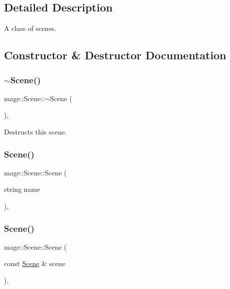 \subsection{Detailed Description}
A class of scenes. 

\subsection{Constructor \& Destructor Documentation}
\hypertarget{classmage_1_1_scene_adc40910fdca62586659c2961fe7e7f3c}{}\label{classmage_1_1_scene_adc40910fdca62586659c2961fe7e7f3c} 
\subsubsection{\texorpdfstring{$\sim$\+Scene()}{~Scene()}}
{\footnotesize\ttfamily mage\+::\+Scene\+::$\sim$\+Scene (\begin{DoxyParamCaption}{ }\end{DoxyParamCaption})\hspace{0.3cm}{\ttfamily [virtual]}, {\ttfamily [default]}}

Destructs this scene. \hypertarget{classmage_1_1_scene_aaed505892f2a639db47e5d5767f41337}{}\label{classmage_1_1_scene_aaed505892f2a639db47e5d5767f41337} 
\subsubsection{\texorpdfstring{Scene()}{Scene()}\hspace{0.1cm}{\footnotesize\ttfamily [1/3]}}
{\footnotesize\ttfamily mage\+::\+Scene\+::\+Scene (\begin{DoxyParamCaption}\item[{string}]{name }\end{DoxyParamCaption})\hspace{0.3cm}{\ttfamily [explicit]}, {\ttfamily [protected]}}

\hypertarget{classmage_1_1_scene_a88d83ccb2e10549d5370f850b2b4c228}{}\label{classmage_1_1_scene_a88d83ccb2e10549d5370f850b2b4c228} 
\subsubsection{\texorpdfstring{Scene()}{Scene()}\hspace{0.1cm}{\footnotesize\ttfamily [2/3]}}
{\footnotesize\ttfamily mage\+::\+Scene\+::\+Scene (\begin{DoxyParamCaption}\item[{const \hyperlink{classmage_1_1_scene}{Scene} \&}]{scene }\end{DoxyParamCaption})\hspace{0.3cm}{\ttfamily [protected]}, {\ttfamily [delete]}}

